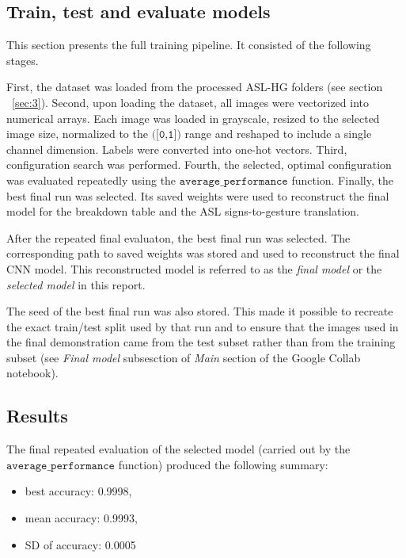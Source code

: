 \documentclass{article}
\newcommand{\code}[1]{\texttt{#1}} %
\begin{document}
\subsection{Train, test and evaluate models}
\label{sec:5.2}
This section presents the full training pipeline. It consisted of the following stages.  

First, the dataset was loaded from the processed ASL-HG folders (see section ~\ref{sec:3}). Second, upon loading the dataset, all images were vectorized into numerical arrays. Each image was loaded in grayscale, 
resized to the selected image size, normalized to the $\code{([0,1])}$ range and reshaped to include a single channel dimension. Labels were converted into one-hot vectors. Third, configuration search was 
performed. Fourth, the selected, optimal configuration was evaluated repeatedly using the $\code{average\_performance}$ function. Finally, the best final run was selected. Its saved weights were used to 
reconstruct the final model for the breakdown table and the ASL signs-to-gesture translation.

After the repeated final evaluaton, the best final run was selected. The corresponding path to saved weights was stored and used to reconstruct the final CNN model.
This reconstructed model is referred to as the \textit{final model} or the \textit{selected model} in this report.  

The seed of the best final run was also stored. This made it possible to recreate the exact train/test split used by that run and to ensure that the images used in 
the final demonstration came from the test subset rather than from the training subset (see \textit{Final model} subsesction of \textit{Main} section of the Google
Collab notebook). 

\subsection{Results}
\label{sec:5.3}
The final repeated evaluation of the selected model (carried out by the $\code{average\_performance}$ function) produced the following summary:

\begin{itemize}
  \item best accuracy: 0.9998,
  \item mean accuracy: 0.9993,
  \item SD of accuracy: 0.0005
\end{itemize} 
\end{document}
